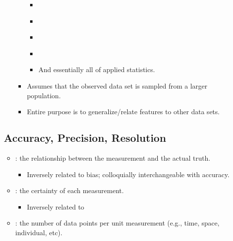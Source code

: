 \begin{itemize}
\begin{itemize}
\begin{itemize}
\begin{itemize}
            \item \hyperref[Chapter: Probability Theory]{}
            \item \hyperref[Chapter: Hypothesis Testing]{}
            \item \hyperref[Chapter: T-Tests]{}
            \item \hyperref[Chapter: Confidence Intervals]{}
            \item And essentially all of applied statistics.
          \end{itemize}
        \item Assumes that the observed data set is sampled from a larger population. 
        \item Entire purpose is to generalize/relate features to other data sets.
      \end{itemize}
  \end{itemize}

  \subsection{Accuracy, Precision, Resolution}
  \begin{itemize}
    \item {}: the relationship between the measurement and the actual truth.
      \begin{itemize}
        \item Inversely related to bias; colloquially interchangeable with accuracy. 
      \end{itemize}
    \item {}: the certainty of each measurement.
      \begin{itemize}
        \item Inversely related to \hyperref[Subsection: Measures of Dispersion]{}
      \end{itemize}
    \item {}: the number of data points per unit measurement (e.g., time, space, individual, etc).
  \end{itemize}
  

\end{itemize}

